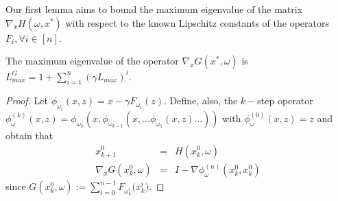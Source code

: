 Our first lemma aims to bound the maximum eigenvalue of the matrix $\nabla_{x} H(\omega,x^*)$ with respect to the known Lipschitz constants of the operators $F_i, \forall i \in [n]$.




\begin{lemma}\label{lemma: eigenvalues_operator}
    The maximum eigenvalue of the operator $\nabla_{x} G(x^*, \omega)$ is $L_{max}^G = 1 + \sum\limits_{i=1}^{n} (\gamma L_{max})^i$.
\end{lemma}
\begin{proof}
    Let $\phi_{\omega_i}(x, z) = x - \gamma F_{\omega_i}(z)$. Define, also, the $k-$step operator $\phi^{(k)}_{\omega}(x, z) = \phi_{\omega_k}\left(x, \phi_{\omega_{k-1}}\left(x,  ... \phi_{\omega_1}\left(x, z\right)...\right)\right)$ with $\phi^{(0)}_{\omega}(x, z) = z$ and obtain that
    \begin{eqnarray}
       x_{k+1}^0 &=& H(x_k^0, \omega) \nonumber \\
       \nabla_{x} G(x_k^0, \omega) &=& I - \nabla \phi^{(n)}_{\omega}(x_k^0, x_k^0) \nonumber
    \end{eqnarray}
    since $G(x_k^0, \omega) := \sum_{i=0}^{n-1} F_{\omega_k^i}\big(x^{i}_k\big)$. 
    

\end{proof}
